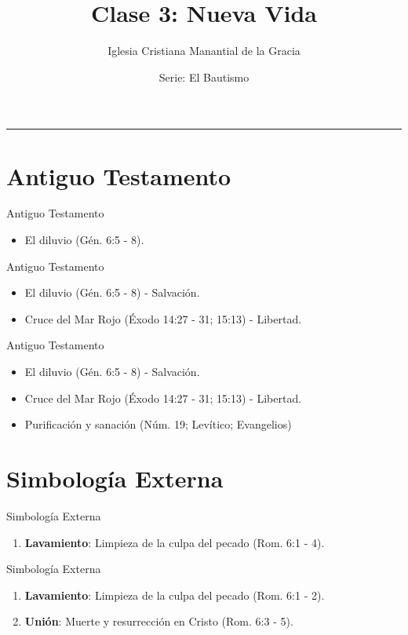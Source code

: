 \documentclass[17pt, aspectratio=169]{beamer}
\title{Clase 3: Nueva Vida}
\author{Iglesia Cristiana Manantial de la Gracia}
\date{Serie: El Bautismo}
\begin{document}
\begin{frame}[plain]
    \titlepage
    \centering
    \color{ICMGGold}\rule{0.5\textwidth}{1pt}
\end{frame}

\section{Antiguo Testamento}

\begin{frame}{Antiguo Testamento}
    \begin{itemize}
        \item El diluvio (G\'en. 6:5 - 8).
    \end{itemize}
\end{frame}

\begin{frame}{Antiguo Testamento}
    \begin{itemize}
        \item El diluvio (G\'en. 6:5 - 8) - Salvaci\'on.
        \item Cruce del Mar Rojo (\'Exodo 14:27 - 31; 15:13) - Libertad.
    \end{itemize}
\end{frame}

\begin{frame}{Antiguo Testamento}
    \begin{itemize}
        \item El diluvio (G\'en. 6:5 - 8) - Salvaci\'on.
        \item Cruce del Mar Rojo (\'Exodo 14:27 - 31; 15:13) - Libertad.
        \item Purificaci\'on y sanaci\'on (N\'um. 19; Lev\'itico; Evangelios)
    \end{itemize}
\end{frame}

\section{Simbolog\'ia Externa}

\begin{frame}{Simbolog\'ia Externa}
    \begin{enumerate}
        \item \textbf{Lavamiento}: Limpieza de la culpa del pecado (Rom. 6:1 - 4).
    \end{enumerate}
\end{frame}

\begin{frame}{Simbolog\'ia Externa}
    \begin{enumerate}
        \item \textbf{Lavamiento}: Limpieza de la culpa del pecado (Rom. 6:1 - 2).
        \item \textbf{Uni\'on}: Muerte y resurrecci\'on en Cristo (Rom. 6:3 - 5).
    \end{enumerate}
\end{frame}
\end{document}
